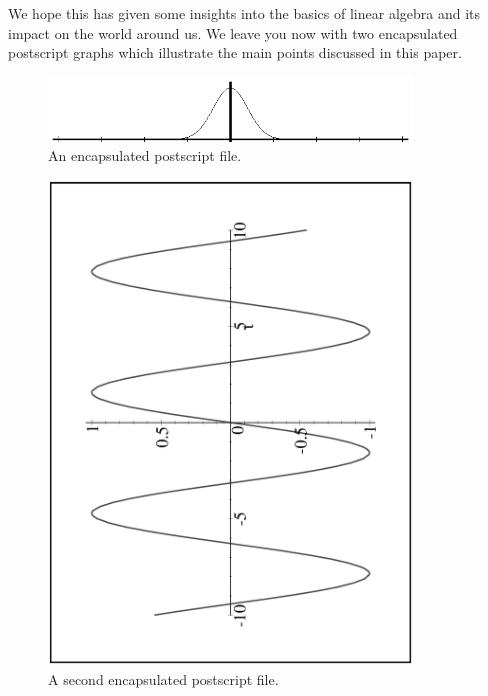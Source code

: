 We hope this has given some insights into the basics of linear
algebra and its impact on the world around us.  We leave you now
with two encapsulated postscript graphs which illustrate the
main points discussed in this paper.


\begin{figure}[h]   %
\begin{center}
\includegraphics[width=3.8in]{ch2-fg1.ps}
\caption{An encapsulated postscript file.}
\end{center}
\end{figure}


%
%


\begin{figure}[h]   %
\begin{center}
\includegraphics[width=3.8in,angle=270]{ch2-fg2.ps}
\caption{A second encapsulated postscript file.}
\end{center}
\end{figure}


